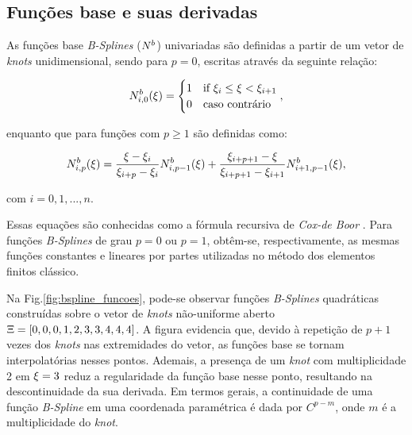 \documentclass[tese_patricia]{subfiles}
\begin{document}
\subsection{Funções base e suas derivadas}

As funções base \textit{B-Splines} ($N^b$) univariadas são definidas a partir de um vetor de \textit{knots} unidimensional, sendo para $p=0$, escritas através da seguinte relação:

\begin{align}
N^b_{i,0}(\xi) = \begin{cases} 1 &\mbox{if } \xi_i\leq\xi<\xi_{i+1} \\
0 & \mbox{caso contrário } \end{cases}, \label{eq:bsplines_0}
\end{align}

\noindent enquanto que para funções com $p\geq1$ são definidas como:

\begin{align}
N^b_{i,p}(\xi)=\frac{\xi-\xi_{i}}{\xi_{i+p}-\xi_{i}}N^b_{i,p-1}(\xi) + 
\frac{\xi_{i+p+1}-\xi}{\xi_{i+p+1}-\xi_{i+1}}N^b_{i+1,p-1}(\xi), \label{eq:bsplines_n}
\end{align}

\noindent com $i=0,1,...,n$.

Essas equações são conhecidas como a fórmula recursiva de \textit{Cox-de Boor} \cite{Cox1972,DEBOOR1972}. Para funções \textit{B-Splines} de grau $p=0$ ou $p=1$, obtêm-se, respectivamente, as mesmas funções constantes e lineares por partes utilizadas no método dos elementos finitos clássico.

Na Fig.\ref{fig:bspline_funcoes}, pode-se observar funções \textit{B-Splines} quadráticas construídas sobre o vetor de \textit{knots} não-uniforme aberto $\Xi=\left[0,0,0,1,2,3,3,4,4,4\right]$. A figura evidencia que, devido à repetição de $p+1$ vezes dos \textit{knots} nas extremidades do vetor, as funções base se tornam interpolatórias nesses pontos. Ademais, a presença de um \textit{knot} com multiplicidade 2 em $\xi=3$ reduz a regularidade da função base nesse ponto, resultando na descontinuidade da sua derivada. Em termos gerais, a continuidade de uma função \textit{B-Spline} em uma coordenada paramétrica é dada por $C^{p-m}$, onde $m$ é a multiplicidade do \textit{knot}.
\end{document}
